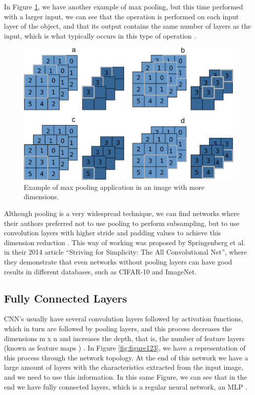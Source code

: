 In Figure \ref{fig:figure122}, we have another example of max pooling, but this time performed with a larger input, we can see that the operation is performed on each input layer of the object, and that its output contains the same number of layers as the input, which is what typically occurs in this type of operation \cite{geron2019}.

\begin{figure}
    \centering
    \includegraphics[scale=0.30]{"Part 3 - Learning Systems/Supervised Learning/Deep Learning/images/figure122.png"}
    \caption{Example of max pooling application in an image with more dimensions.}
    \label{fig:figure122}
\end{figure}

Although pooling is a very widespread technique, we can find networks where their authors preferred not to use pooling to perform subsampling, but to use convolution layers with higher stride and padding values to achieve this dimension reduction \cite{elgendy2020}\cite{adrian2017}. This way of working was proposed by Springenberg et al. in their 2014 article “Striving for Simplicity: The All Convolutional Net”, where they demonstrate that even networks without pooling layers can have good results in different databases, such as CIFAR-10 and ImageNet.

\subsection{Fully Connected Layers}

CNN's usually have several convolution layers followed by activation functions, which in turn are followed by pooling layers, and this process decreases the dimensions m x n and increases the depth, that is, the number of feature layers (known as feature maps ) \cite{elgendy2020}\cite{geron2019}. In Figure \ref{fig:figure123}, we have a representation of this process through the network topology. At the end of this network we have a large amount of layers with the characteristics extracted from the input image, and we need to use this information. In this same Figure, we can see that in the end we have fully connected layers, which is a regular neural network, an MLP \cite{elgendy2020}.

